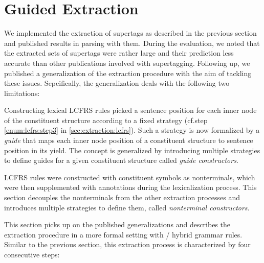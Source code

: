 \documentclass[../../document.tex]{subfiles}
\begin{document}
    \section{Guided Extraction} \label{sec:extraction:guided}
    We implemented the extraction of  supertags as described in the previous section and published results in parsing with them. \cite{RupMoe21}
    During the evaluation, we noted that the extracted sets of supertags were rather large and their prediction less accurate than other publications involved with supertagging.
    Following up, we published a generalization of the extraction procedure with the aim of tackling these issues. \citep{Rup22}
    Sepcifically, the generalization deals with the following two limitations:
    \begin{compactitem}
        \item
            Constructing lexical LCFRS rules picked a sentence position for each inner node of the constituent structure according to a fixed strategy (cf.\@ step \ref{enum:lcfrs:step3} in \cref{sec:extraction:lcfrs}).
            Such a strategy is now formalized by a \emph{guide} that maps each inner node position of a constituent structure to sentence position in its yield.
            The concept is generalized by introducing multiple strategies to define guides for a given constituent structure called \emph{guide constructors}.
        \item
            LCFRS rules were constructed with constituent symbols as nonterminals, which were then supplemented with annotations during the lexicalization process.
            This section decouples the nonterminals from the other extraction processes and introduces multiple strategies to define them, called \emph{nonterminal constructors}.
    \end{compactitem}
    This section picks up on the published generalizations and describes the extraction procedure in a more formal setting with / hybrid grammar rules.
    Similar to the previous section, this extraction process is characterized by four consecutive steps:
\end{document}
